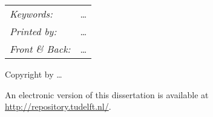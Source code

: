 \begin{titlepage}
\noindent
\begin{tabular}{@{}p{}@{}p{}}
    \textit{Keywords:} & \ldots \\[\medskipamount]
    \textit{Printed by:} & \ldots \\[\medskipamount]
    \textit{Front \& Back:} & \ldots
\end{tabular}

\vspace{4\bigskipamount}

\noindent Copyright  by \ldots


\medskip

\medskip
\noindent An electronic version of this dissertation is available at \\
\url{http://repository.tudelft.nl/}.

\end{titlepage}

